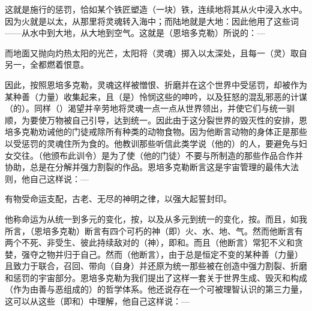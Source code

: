 这就是施行的惩罚，恰如某个铁匠塑造（一块）铁，连续地将其从火中浸入水中。因为火就是以太，从那里将灵魂转入海中；而陆地就是大地：因此他用了这些词——从水中到大地，从大地到空气。这就是（恩培多克勒）所说的：—\par

而地面又抛向\newline{}灼热太阳的光芒，太阳将（灵魂）\newline{}掷入以太深处，且每一（灵）\newline{}取自另一，全都燃着恨意。\newline{}\par

因此，按照恩培多克勒，灵魂这样被憎恨、折磨并在这个世界中受惩罚，却被作为某种善（力量）收集起来，且（是）怜悯这些的呻吟，以及狂怒的混乱邪恶的计谋（的）。同样（）渴望并辛劳地将灵魂一点一点从世界领出，并使它们与统一驯顺，为要使万物被自己引导，达到统一。因此由于这分裂世界的毁灭性的安排，恩培多克勒劝诫他的门徒戒除所有种类的动物食物。因为他断言动物的身体正是那些以受惩罚的灵魂住所为食的。他教训那些听信此类学说（他的）的人，要避免与妇女交往。（他颁布此训令）是为了使（他的门徒）不要与所制造的那些作品合作并协助，总是在分解并强力割裂的作品。恩培多克勒断言这是宇宙管理的最伟大法则，他自己这样说：—\par

有物受命运支配，古老、\newline{}无尽的神明之律，以强大起誓封印。\newline{}\par

他称命运为从统一到多元的变化，按，以及从多元到统一的变化，按。而且，如我所言，（恩培多克勒）断言有四个可朽的神（即）火、水、地、气。然而他断言有两个不死、非受生、彼此持续敌对的（神），即和。而且（他断言）常犯不义和贪婪，强夺之物并归于自己。然而（他断言），由于总是恒定不变的某种善（力量）且致力于联合，召回、带向（自身）并还原为统一那些被在创造中强力割裂、折磨和惩罚的宇宙部分。恩培多克勒为我们提出了这样一套关于世界生成、毁灭和构成（作为由善与恶组成的）的哲学体系。他还说存在一个可被理智认识的第三力量，这可以从这些（即和）中理解，他自己这样说：—\par

